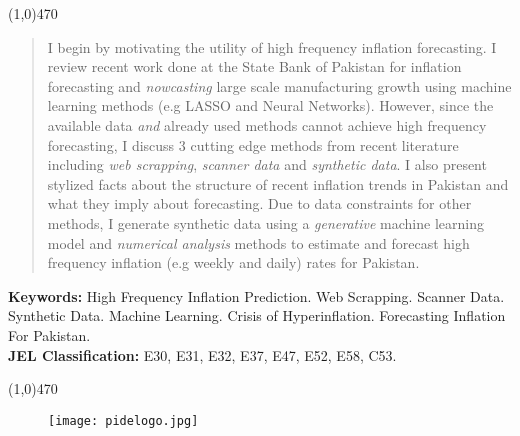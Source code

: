 \documentclass[12pt]{article}
\newcommand{\1}{\mathbbm 1}
\begin{document}
		\begin{center}
			\line(1,0){470}
		\end{center}
		\begin{spacing}{1.1}
			\vspace{-3ex}
			\begin{abstract}
				\noindent 
				I begin by motivating the utility of high frequency inflation forecasting. I review recent work done at the State Bank of Pakistan for inflation forecasting and \textit{nowcasting} large scale manufacturing growth using machine learning methods (e.g LASSO and Neural Networks). However, since the available data \textit{and} already used methods cannot achieve high frequency forecasting, I discuss $3$ cutting edge methods from recent literature including \textit{web scrapping}, \textit{scanner data} and \textit{synthetic data}. I also present stylized facts about the structure of recent inflation trends in Pakistan and what they imply about forecasting. Due to data constraints for other methods, I generate synthetic data using a \textit{generative} machine learning model and \textit{numerical analysis} methods to estimate and forecast high frequency inflation (e.g weekly and daily) rates for Pakistan. 
				
			\end{abstract}
		\end{spacing}
		\textbf{Keywords:} High Frequency Inflation Prediction. Web Scrapping. Scanner Data. Synthetic Data. Machine Learning. Crisis of Hyperinflation. Forecasting Inflation For Pakistan. {}\\
		\textbf{JEL Classification:} E30, E31, E32, E37, E47, E52, E58, C53.
		\\
		\begin{center}
			\vspace{-8ex}
			\line(1,0){470}
		\end{center}
		\baselineskip=18pt 
		
		\newpage{}
		
		\begin{figure}[H]
			\begin{center}
				\texttt{[image: pidelogo.jpg]}		
				\caption*{}
			\end{center}
		\end{figure}
		
\end{document}
